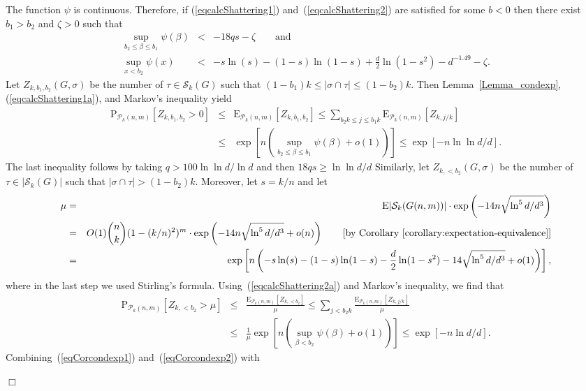 \documentclass[a4paper,10pt]{article}
\makeatletter
\newenvironment{proof}{\noindent{\bf Proof\@:}}{\hfill $\Box$\\}
\newcommand\cS{\mathcal{S}}
\newcommand\cP{\mathcal{P}}
\newcommand\Erw{\mathrm{E}}
\newcommand\pr{\mathrm{P}}
\newcommand{\bink}[2] {{{#1}\choose {#2}}}
\newcommand\bc[1]{\left({#1}\right)}
\newcommand\brk[1]{\left\lbrack{#1}\right\rbrack}
\newcommand\Lem{Lemma}
\makeatother
\begin{document}
\begin{proof}
The function $\psi$ is continuous.
Therefore, if (\ref{eqcalcShattering1}) and~(\ref{eqcalcShattering2}) 
are satisfied for some $b<0$ then there exist $b_1>b_2$ and $\zeta>0$ such that
	\begin{eqnarray}\label{eqcalcShattering1a}
	\sup_{b_2\leq\beta\leq b_1}\psi(\beta)&<&-18qs-\zeta\qquad\mbox{and}\\
	\sup_{x<b_2}\psi(x)&<&-s\ln(s)-(1-s)\ln(1-s)+\frac{d}2\ln(1-s^2)-d^{-1.49}-\zeta.
		\label{eqcalcShattering2a}
	\end{eqnarray}
Let $Z_{k,b_1,b_2}(G,\sigma)$ be the number of $\tau\in\cS_k(G)$ such that $(1-b_1)k\leq|\sigma\cap\tau|\leq(1-b_2)k$.
Then \Lem~\ref{Lemma_condexp}, (\ref{eqcalcShattering1a}), and Markov's
inequality yield
	\begin{eqnarray}\nonumber
	\pr_{\cP_k(n,m)}\brk{Z_{k,b_1,b_2}>0}&\leq&
		\Erw_{\cP_k(n,m)}\brk{Z_{k,b_1,b_2}}
			\leq\sum_{b_2k\leq j\leq b_1k}\Erw_{\cP_k(n,m)}\brk{Z_{k,j/k}}\\
		&\leq&\exp\brk{n\bc{\sup_{b_2\leq\beta\leq b_1}\psi(\beta)+o(1)}}\leq
			\exp\brk{-n\ln\ln d/d}.
				\label{eqCorcondexp1}
	\end{eqnarray}
The last inequality follows by taking $q>100\ln\ln d/\ln d$
and then $18qs\geq \ln\ln d/d$
Similarly, let $Z_{k,<b_2}(G,\sigma)$ be the number of $\tau\in|\cS_k(G)|$
such that $|\sigma\cap\tau|>(1-b_2)k$. Moreover, let $s=k/n$ and let
\begin{eqnarray*}
	\mu&=&\Erw|\cS_k(G(n,m))|\cdot\exp\bc{-14n\sqrt{\ln^5d/d^3}}\\
		&=&O(1)\bink nk(1-(k/n)^2)^m\cdot\exp\bc{-14n\sqrt{\ln^5d/d^3}+o(n)} 
		\qquad\mbox{[by Corollary \ref{corollary:expectation-equivalence}]}\\
		&=&\exp\brk{n\bc{-s\ln(s)-(1-s)\ln(1-s)-\frac d2\ln(1-s^2)-14\sqrt{\ln^5d/d^3}+o(1)}},
	\end{eqnarray*}
where in the last step we used Stirling's formula.
Using~(\ref{eqcalcShattering2a}) and Markov's inequality, we find that
	\begin{eqnarray}\nonumber
	\pr_{\cP_k(n,m)}\brk{Z_{k,<b_2}>\mu}&\leq&
		\frac{\Erw_{\cP_k(n,m)}\brk{Z_{k,<b_2}}}\mu
			\leq\sum_{ j<b_2k}\frac{\Erw_{\cP_k(n,m)}\brk{Z_{k,j/k}}}\mu\\
		&\leq&\frac1\mu\exp\brk{n\bc{\sup_{\beta< b_2}\psi(\beta)+o(1)}}
				\leq\exp\brk{-n\ln d/d}.
					\label{eqCorcondexp2}
	\end{eqnarray}
Combining~(\ref{eqCorcondexp1}) and~(\ref{eqCorcondexp2}) with 

\end{proof}
\end{document}

